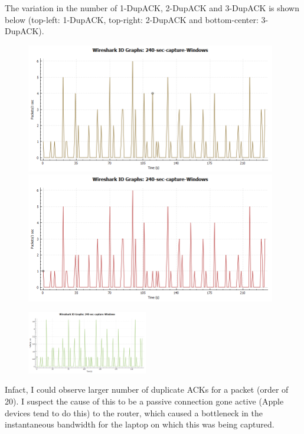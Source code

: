 \documentclass{article}
\begin{document}
\begin{flushleft}
The variation in the number of 1-DupACK, 2-DupACK and 3-DupACK is shown below (top-left: 1-DupACK, top-right: 2-DupACK and bottom-center: 3-DupACK).
\begin{figure}[H]
\begin{minipage}{0.48\linewidth}
\centering
\includegraphics[width=0.975\textwidth]{1-dup-ack.png}
\end{minipage}
\hfill
\begin{minipage}{0.48\linewidth}
\centering
\includegraphics[width=0.975\textwidth]{2-dup-ack.png}
\end{minipage}
\end{figure}
\begin{figure}[H]
\centering
\includegraphics[width=0.47\textwidth]{3-dup-ack.png}
\end{figure}

Infact, I could observe larger number of duplicate ACKs for a packet (order of 20). I suspect the cause of this to be a passive connection gone active (Apple devices tend to do this) to the router, which caused a bottleneck in the instantaneous bandwidth for the laptop on which this was being captured.
\end{flushleft}
\end{document}
